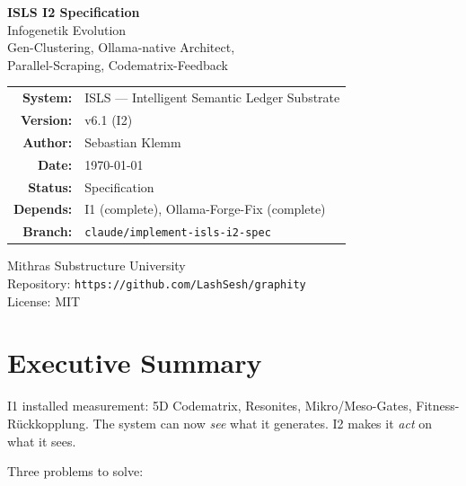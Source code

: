 \documentclass[11pt,a4paper]{article}
\begin{document}
\begin{titlepage}
\centering
\vspace*{2.5cm}

{\Huge\bfseries\color{isls-blue} ISLS I2 Specification}\\[0.5cm]
{\LARGE\color{isls-orange} Infogenetik Evolution}\\[0.3cm]
{\large\color{isls-gray} Gen-Clustering, Ollama-native Architect,\\
Parallel-Scraping, Codematrix-Feedback}\\[2cm]

{\large
\begin{tabular}{rl}
\textbf{System:}       & ISLS --- Intelligent Semantic Ledger Substrate \\
\textbf{Version:}      & v6.1 (I2) \\
\textbf{Author:}       & Sebastian Klemm \\
\textbf{Date:}         & \today \\
\textbf{Status:}       & Specification \\
\textbf{Depends:}      & I1 (complete), Ollama-Forge-Fix (complete) \\
\textbf{Branch:}       & \texttt{claude/implement-isls-i2-spec} \\
\end{tabular}
}

\vfill

{\small\color{isls-gray}
Mithras Substructure University\\
Repository: \texttt{https://github.com/LashSesh/graphity}\\
License: MIT
}
\end{titlepage}

\tableofcontents
\newpage


\section{Executive Summary}

I1 installed measurement: 5D Codematrix, Resonites, Mikro/Meso-Gates, 
Fitness-R\"uckkopplung. The system can now \emph{see} what it generates. 
I2 makes it \emph{act} on what it sees.

Three problems to solve:
\end{document}
